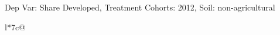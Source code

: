 \begin{table}[H]
\captionlistentry[table]{}
\label{table:beaver_land_class_DVis_land_class_3_SCg1_SSNAG}
\scriptsize %
Dep Var: Share Developed, Treatment Cohorts: 2012, Soil: non-agricultural \\
\begin{threeparttable}
\begin{tabulary}{\textwidth}{l*{7}{c}@{}}
\toprule \toprule
\noalign{\smallskip}
\noalign{\smallskip}
\midrule \bottomrule
\end{tabulary}
\medskip
\end{threeparttable}
\end{table}
